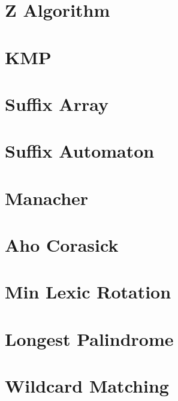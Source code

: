 \section{Z Algorithm}


\section{KMP}


\section{Suffix Array}


\section{Suffix Automaton}


\section{Manacher}


\section{Aho Corasick}


\section{Min Lexic Rotation}


\section{Longest Palindrome}


\section{Wildcard Matching}


